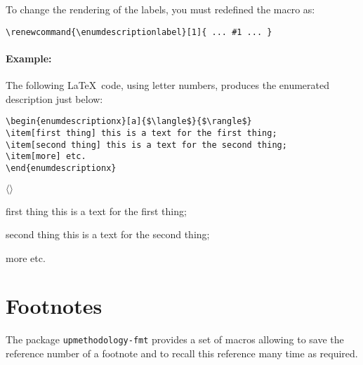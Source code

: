 \documentclass[book]{upmethodology-document}
\begin{document}
To change the rendering of the labels, you must redefined the macro as:
\begin{verbatim}
\renewcommand{\enumdescriptionlabel}[1]{ ... #1 ... }
\end{verbatim}


\paragraph{Example:} The following \LaTeX~code, using letter numbers, produces the enumerated description just below:
\begin{verbatim}
\begin{enumdescriptionx}[a]{$\langle$}{$\rangle$}
\item[first thing] this is a text for the first thing;
\item[second thing] this is a text for the second thing;
\item[more] etc.
\end{enumdescriptionx}
\end{verbatim}

\begin{enumdescriptionx}[a]{$\langle$}{$\rangle$}
\item[first thing] this is a text for the first thing;
\item[second thing] this is a text for the second thing;
\item[more] etc.
\end{enumdescriptionx}


\section{Footnotes}

The package \texttt{upmethodology-fmt} provides a set of macros allowing to save the reference number of a footnote and to recall this reference many time as required.
\end{document}
